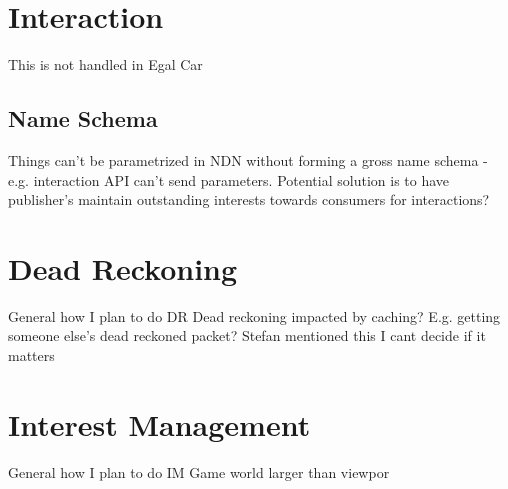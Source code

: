 \section{Interaction}\label{sec:des:interaction}
This is not handled in Egal Car
\subsection{Name Schema}
Things can't be parametrized in NDN without forming a gross name schema - e.g. interaction API can't send parameters. Potential solution is to have publisher's maintain outstanding interests towards consumers for interactions?



\section{Dead Reckoning}\label{sec:des:dr}
General how I plan to do DR 
Dead reckoning impacted by caching? E.g. getting someone else's dead reckoned packet? Stefan mentioned this I cant decide if it matters


\section{Interest Management}\label{sec:des:im}
General how I plan to do IM 
Game world larger than viewpor
